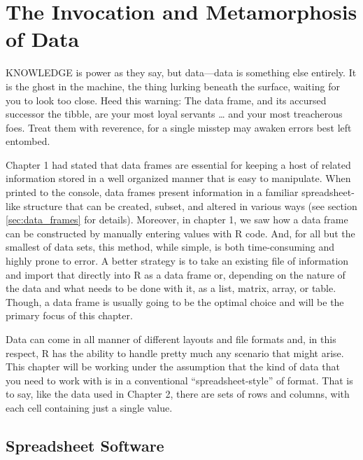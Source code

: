 \chapter{The Invocation and Metamorphosis of Data}

\IMFellEnglish
\lettrine[lines=5, realheight]{K}{NOWLEDGE} is power as they say, but data—data is something else entirely. It is the ghost in the machine, the thing lurking beneath the surface, waiting for you to look too close. Heed this warning: The data frame, and its accursed successor the tibble, are your most loyal servants \ldots{} and your most treacherous foes. Treat them with reverence, for a single misstep may awaken errors best left entombed.

\normalfont

Chapter 1 had stated that \glspl{data frame} are essential for keeping a host of related information stored in a well organized manner that is easy to manipulate. When printed to the console, data frames present information in a familiar spreadsheet-like structure that can be created, subset, and altered in various ways (see section \ref{sec:data_frames} for details). Moreover, in chapter 1, we saw how a data frame can be constructed by manually entering values with R code. And, for all but the smallest of data sets, this method, while simple, is both time-consuming and highly prone to error. A better strategy is to take an existing file of information and import that directly into R as a data frame or, depending on the nature of the data and what needs to be done with it, as a list, matrix, array, or table. Though, a data frame is usually going to be the optimal choice and will be the primary focus of this chapter.

Data can come in all manner of different layouts and file formats and, in this respect, R has the ability to handle pretty much any scenario that might arise. This chapter will be working under the assumption that the kind of data that you need to work with is in a conventional ``spreadsheet-style'' of format. That is to say, like the  data used in Chapter 2, there are sets of rows and columns, with each cell containing just a single value.

\section{Spreadsheet Software}
\label{sec:spreadsheet_soft}

